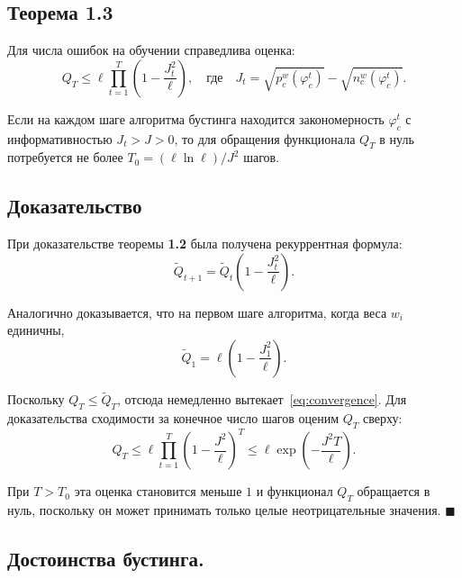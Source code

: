 \subsection*{Теорема 1.3}
Для числа ошибок на обучении справедлива оценка:
\begin{equation}
    Q_T \leq \ell \prod_{t=1}^T \left( 1 - \frac{J_t^2}{\ell} \right), \quad \text{где} \quad J_t = \sqrt{p_c^w(\varphi_c^t)} - \sqrt{n_c^w(\varphi_c^t)}.
    \label{eq:convergence}
\end{equation}

Если на каждом шаге алгоритма бустинга находится закономерность $\varphi_c^t$ с информативностью $J_t > J > 0$, то для обращения функционала $Q_T$ в нуль потребуется не более $T_0 = (\ell \ln \ell) / J^2$ шагов.

\subsection*{Доказательство}
При доказательстве теоремы \textbf{1.2} была получена рекуррентная формула:
\begin{equation}
    \tilde{Q}_{t+1} = \tilde{Q}_t \left( 1 - \frac{J_t^2}{\ell} \right).
\end{equation}

Аналогично доказывается, что на первом шаге алгоритма, когда веса $w_i$ единичны,
\[
    \tilde{Q}_1 = \ell \left( 1 - \frac{J_1^2}{\ell} \right).
\]

Поскольку $Q_T \leq \tilde{Q}_T$, отсюда немедленно вытекает~\eqref{eq:convergence}. Для доказательства сходимости за конечное число шагов оценим $Q_T$ сверху:
\[
    Q_T \leq \ell \prod_{t=1}^T \left( 1 - \frac{J^2}{\ell} \right)^T \leq \ell \exp\left( -\frac{J^2 T}{\ell} \right).
\]

При $T > T_0$ эта оценка становится меньше $1$ и функционал $Q_T$ обращается в нуль, поскольку он может принимать только целые неотрицательные значения. \hfill $\blacksquare$

\subsection*{Достоинства бустинга.}

